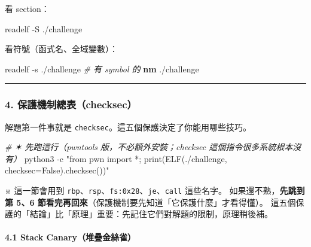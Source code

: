 \documentclass[10pt,a4paper]{article}
\newenvironment{Shaded}{\begin{snugshade}}{\end{snugshade}}
\newcommand{\AttributeTok}[1]{\textcolor[rgb]{0.13,0.29,0.53}{#1}}
\newcommand{\CommentTok}[1]{\textcolor[rgb]{0.56,0.35,0.01}{\textit{#1}}}
\newcommand{\ExtensionTok}[1]{#1}
\newcommand{\FunctionTok}[1]{\textcolor[rgb]{0.13,0.29,0.53}{\textbf{#1}}}
\newcommand{\NormalTok}[1]{#1}
\newcommand{\StringTok}[1]{\textcolor[rgb]{0.31,0.60,0.02}{#1}}
\renewenvironment{Shaded}{%
  \def\FrameCommand{\fboxsep=3.2pt\colorbox{shadecolor}}%
  \MakeFramed{\advance\hsize-\width\FrameRestore\small}%
}{%
  \endMakeFramed
}
\renewenvironment{quote}{%
  \begin{mdframed}[linewidth=0pt,innerleftmargin=0pt,innerrightmargin=0pt,
    innerbottommargin=0pt,innertopmargin=0pt,skipabove=0.55em,skipbelow=0.55em,
    leftmargin=0.9em,rightmargin=0.4em,startcode={\color{quotebar}\vrule width 2.6pt},%
    endcode={}]%
  \itshape\color{black}%
}{%
  \end{mdframed}%
}
\begin{document}
看 section：

\begin{Shaded}
\begin{Highlighting}[]
\ExtensionTok{readelf} \AttributeTok{{-}S}\NormalTok{ ./challenge}
\end{Highlighting}
\end{Shaded}

看符號（函式名、全域變數）：

\begin{Shaded}
\begin{Highlighting}[]
\ExtensionTok{readelf} \AttributeTok{{-}s}\NormalTok{ ./challenge     }\CommentTok{\# 有 symbol 的}
\FunctionTok{nm}\NormalTok{ ./challenge}
\end{Highlighting}
\end{Shaded}

\begin{center}\rule{0.5\linewidth}{0.5pt}\end{center}

\subsubsection{4.
保護機制總表（checksec）}\label{ux4fddux8b77ux6a5fux5236ux7e3dux8868checksec}

解題第一件事就是 \texttt{checksec}。這五個保護決定了你能用哪些技巧。

\begin{Shaded}
\begin{Highlighting}[]
\CommentTok{\# ✶ 先跑這行（pwntools 版，不必額外安裝；\textasciigrave{}checksec\textasciigrave{} 這個指令很多系統根本沒有）}
\ExtensionTok{python3} \AttributeTok{{-}c} \StringTok{"from pwn import *; print(ELF(\textquotesingle{}./challenge\textquotesingle{}, checksec=False).checksec())"}
\end{Highlighting}
\end{Shaded}

\begin{quote}
※ 這一節會用到
\texttt{rbp}、\texttt{rsp}、\texttt{fs:\allowbreak{}0x28}、\texttt{je}、\texttt{call}
這些名字。 如果還不熟，\textbf{先跳到第 5、6
節看完再回來}（保護機制要先知道「它保護什麼」才看得懂）。
這五個保護的「結論」比「原理」重要：先記住它們對解題的限制，原理稍後補。
\end{quote}

\paragraph{4.1 Stack
Canary（堆疊金絲雀）}\label{stack-canaryux5806ux758aux91d1ux7d72ux96c0}
\end{document}
